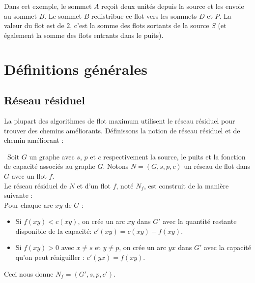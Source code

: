 \documentclass[a4paper]{article}
\begin{document}
Dans cet exemple, le sommet $A$ reçoit deux unités depuis la source et les envoie au sommet $B$. Le sommet $B$ redistribue ce flot vers les sommets $D$ et $P$. La valeur du flot est de $2$, c'est la somme des flots sortants de la source $S$ (et également la somme des flots entrants dans le puits). 

\section{Définitions générales}

\subsection{Réseau résiduel}
La plupart des algorithmes de flot maximum utilisent le réseau résiduel pour trouver des chemins améliorants. Définissons la notion de réseau résiduel et de chemin améliorant :
\begin{definition}\,
Soit $G$ un graphe avec $s$, $p$ et $c$ respectivement la source, le puits et la fonction de capacité associés au graphe $G$. Notons $N = (G,s,p,c)$ un réseau de flot dans $G$ avec un flot $f$.\\
Le réseau résiduel de $N$ et d'un flot $f$, noté $N_f$, est construit de la manière suivante :\\
Pour chaque arc $xy$ de $G$ :
\begin{itemize}
	\item
    Si $f(xy)<c(xy)$, on crée un arc $xy$ dans $G'$ avec la quantité restante disponible de la capacité: $c'(xy) = c(xy) - f(xy)$.
    \item 
    Si $f(xy)>0$ avec $x\ne s$ et $y\ne p$, on crée un arc $yx$ dans $G'$ avec la capacité qu'on peut réaiguiller : $c'(yx) = f(xy)$.
\end{itemize}
Ceci nous donne $N_f = (G',s,p,c')$.
\end{definition}
\end{document}
